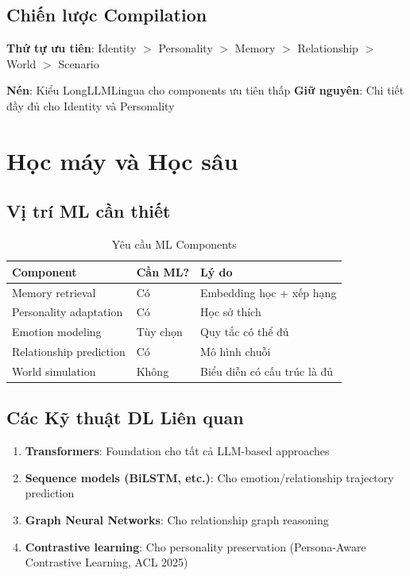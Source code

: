 \documentclass[10pt,leqno]{amsart}
\begin{document}
\subsection{Chiến lược Compilation}

\textbf{Thứ tự ưu tiên}: Identity $>$ Personality $>$ Memory $>$ Relationship $>$ World $>$ Scenario

\textbf{Nén}: Kiểu LongLLMLingua cho components ưu tiên thấp
\textbf{Giữ nguyên}: Chi tiết đầy đủ cho Identity và Personality


\section{Học máy và Học sâu}

\subsection{Vị trí ML cần thiết}

\begin{table}[H]
\centering
\caption{Yêu cầu ML Components}
\label{tab:ml-requirements}
\begin{tabular}{lll}
\toprule
\textbf{Component} & \textbf{Cần ML?} & \textbf{Lý do} \\
\midrule
Memory retrieval & Có & Embedding học + xếp hạng \\
Personality adaptation & Có & Học sở thích \\
Emotion modeling & Tùy chọn & Quy tắc có thể đủ \\
Relationship prediction & Có & Mô hình chuỗi \\
World simulation & Không & Biểu diễn có cấu trúc là đủ \\
\bottomrule
\end{tabular}
\end{table}

\subsection{Các Kỹ thuật DL Liên quan}

\begin{enumerate}
    \item \textbf{Transformers}: Foundation cho tất cả LLM-based approaches
    \item \textbf{Sequence models (BiLSTM, etc.)}: Cho emotion/relationship trajectory prediction
    \item \textbf{Graph Neural Networks}: Cho relationship graph reasoning
    \item \textbf{Contrastive learning}: Cho personality preservation (Persona-Aware Contrastive Learning, ACL 2025)
\end{enumerate}
\end{document}
